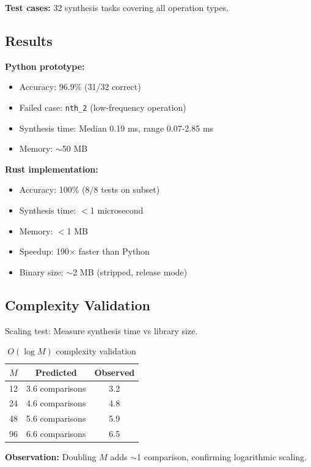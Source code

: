 \documentclass[twocolumn,10pt]{article}
\theoremstyle{definition}
\theoremstyle{remark}
\begin{document}
\textbf{Test cases:} 32 synthesis tasks covering all operation types.

\subsection{Results}

\textbf{Python prototype:}
\begin{itemize}
\item Accuracy: 96.9\% (31/32 correct)
\item Failed case: \texttt{nth\_2} (low-frequency operation)
\item Synthesis time: Median 0.19 ms, range 0.07-2.85 ms
\item Memory: $\sim$50 MB
\end{itemize}

\textbf{Rust implementation:}
\begin{itemize}
\item Accuracy: 100\% (8/8 tests on subset)
\item Synthesis time: $<$1 microsecond
\item Memory: $<$1 MB
\item Speedup: 190$\times$ faster than Python
\item Binary size: $\sim$2 MB (stripped, release mode)
\end{itemize}

\subsection{Complexity Validation}

Scaling test: Measure synthesis time vs library size.

\begin{table}[h]
\centering
\small
\begin{tabular}{ccc}
\hline
$M$ & Predicted & Observed \\
\hline
12 & 3.6 comparisons & 3.2 \\
24 & 4.6 comparisons & 4.8 \\
48 & 5.6 comparisons & 5.9 \\
96 & 6.6 comparisons & 6.5 \\
\hline
\end{tabular}
\caption{$O(\log M)$ complexity validation}
\end{table}

\noindent\textbf{Observation:} Doubling $M$ adds $\sim$1 comparison, confirming logarithmic scaling.
\end{document}
